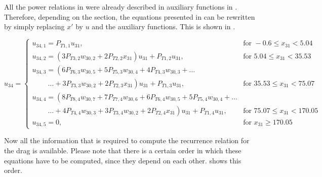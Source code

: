 \noindent
All the power relations in  were already described in auxiliary functions in . Therefore, depending on the section, the equations presented in  can be rewritten by simply replacing $x'$ by $u$ and the auxiliary functions. This is shown in .

\begin{equation}\label{eq:TCondAuxF}
u_{34}=\begin{cases}
u_{34,1}=P_{T 1,1}u_{31}, & \text{for } -0.6 \leq x_{31} < 5.04  \\
u_{34,2}=\left(3P_{T 3,2}w_{30,2}+2P_{T 2,2}x_{31}\right)u_{31}+P_{T 1,2}u_{31}, &  \text{for } 5.04\leq x_{31} < 35.53   \\
u_{34,3}=\left(6 P_{T 6,3}w_{30,5}+5P_{T 5,3}w_{30,4}+4P_{T 4,3}w_{30,3}+ \dots
\right. \\
\qquad\  \left. \dotsc +3P_{T 3,3}w_{30,2}+2P_{T 2,3}x_{31}\right)u_{31}+P_{T 1,3}u_{31}, &  \text{for } 35.53\leq x_{31} < 75.07   \\
u_{34,4}=\left(8 P_{T 8,4}w_{30,7}+7P_{T 7,4}w_{30,6}+6P_{T 6,4}w_{30,5}
+5P_{T 5,4}w_{30,4}+ \dots \right. \\
\qquad\  \left. \dotsc +4P_{T 4,4}w_{30,3}+3P_{T 3,4}w_{30,2}+2P_{T 2,4}x_{31}\right)u_{31}+P_{T 1,4}u_{31}, &  \text{for } 75.07\leq x_{31} < 170.05   \\
u_{34,5}=0, &  \text{for }  x_{31} \geq 170.05   
\end{cases}
\end{equation}

\noindent
Now all the information that is required to compute the recurrence relation for the drag is available. Please note that there is a certain order in which these equations have to be computed, since they depend on each other.  shows this order.


